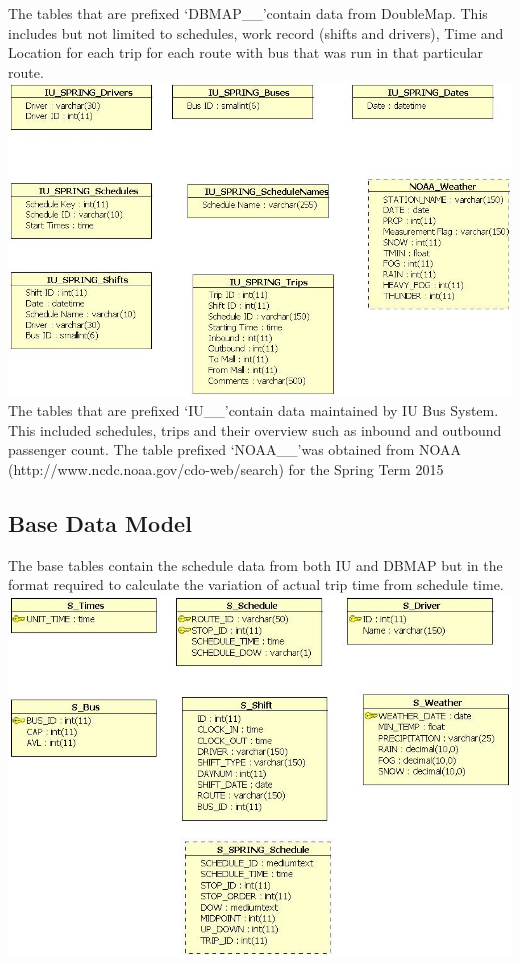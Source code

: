 \documentclass[12pt]{article}
\begin{document}
The tables that are prefixed \lq DBMAP\_\_\rq contain data from DoubleMap. This includes but not limited to schedules, work record (shifts and drivers), Time and Location for each trip for each route with bus that was run in that particular route. \\
\includegraphics[scale=0.5]{resources/IU_access}\\[1cm] 
The tables that are prefixed \lq IU\_\_\rq contain data maintained by IU Bus System. This included schedules, trips and their overview such as inbound and outbound passenger count. The table prefixed \lq NOAA\_\_\rq was obtained from NOAA (http://www.ncdc.noaa.gov/cdo-web/search) for the 
Spring Term 2015\\
\subsection{Base Data Model}
The base tables contain the schedule data from both IU and DBMAP but in the format required to calculate the variation of actual trip time from schedule time. \\
\includegraphics[scale=0.5]{resources/Source_spring}\\[1cm] 
\end{document}
